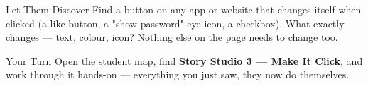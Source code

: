 \documentclass[aspectratio=169]{beamer}
\begin{document}
\begin{frame}{Let Them Discover}
    \Large
    Find a button on any app or website that changes itself when clicked (a like button, a "show password" eye icon, a checkbox). What exactly changes — text, colour, icon? Nothing else on the page needs to change too.
\end{frame}

\begin{frame}{Your Turn}
    \Large
    Open the student map, find \textbf{Story Studio 3 — Make It Click}, and work through it
    hands-on --- everything you just saw, they now do themselves.
\end{frame}
\end{document}
